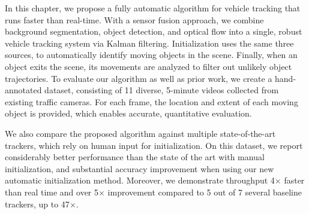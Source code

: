 In this chapter, we propose a fully automatic algorithm for vehicle tracking that runs faster than real-time. 
With a sensor fusion approach, we combine background segmentation, object detection, and optical flow into a single, robust vehicle tracking system via Kalman filtering. 
Initialization uses the same three sources, to automatically identify moving objects in the scene. 
Finally, when an object exits the scene, its movements are analyzed to filter out unlikely object trajectories.
To evaluate our algorithm as well as prior work, we create a hand-annotated dataset, consisting of 11 diverse, 5-minute videos collected from existing traffic cameras. 
For each frame, the location and extent of each moving object is provided, which enables accurate, quantitative evaluation.

We also compare the proposed algorithm against multiple state-of-the-art trackers, which rely on human input for initialization.
On this dataset, we report considerably better performance than the state of the art with manual initialization, and substantial accuracy improvement when using our new automatic initialization method. 
Moreover, we demonstrate throughput 4$\times$ faster than real time and over 5$\times$ improvement compared to 5 out of 7 several baseline trackers, up to 47$\times$. 





